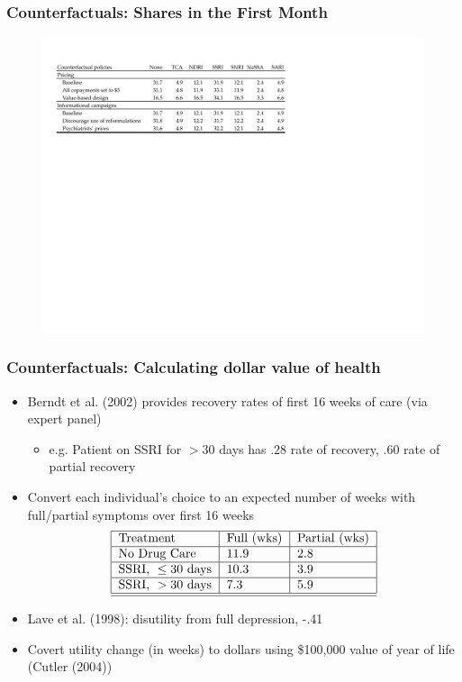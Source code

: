 \documentclass[xcolor=pdftex,dvipsnames,table,mathserif,aspectratio=169]{beamer}
\begin{document}
\begin{frame}
\frametitle{Counterfactuals: Shares in the First Month}

\begin{figure}[h!]
\centering\includegraphics[width=1.0\linewidth]{./resources/ctfl_slide.pdf}
\end{figure}
\end{frame}


\begin{frame}
\frametitle{Counterfactuals: Calculating dollar value of health}

\begin{itemize}
\item Berndt et al. (2002) provides recovery rates of first 16 weeks of care
(via expert panel)

\begin{itemize}
\item e.g. Patient on SSRI for $>30$ days has $.28$ rate of recovery, $.60$
rate of partial recovery
\end{itemize}

\item Convert each individual's choice to an expected number of weeks with
full/partial symptoms over first 16 weeks%
\[
\text{%
\begin{tabular}{|l|l|l|}
\hline
Treatment & Full (wks) & Partial (wks) \\ \hline
No Drug Care & $11.9$ & $2.8$ \\ \hline
$\text{SSRI, }\leq \text{30 days}$ & $10.3$ & $3.9$ \\ \hline
$\text{SSRI, }> \text{30 days}$ & $7.3$ & $5.9$ \\ \hline\hline
\end{tabular}%
} 
\]

\item Lave et al. (1998): disutility from full depression, -.41

\item Covert utility change (in weeks) to dollars using \$100,000 value of
year of life (Cutler (2004))
\end{itemize}
\end{frame}
\end{document}
